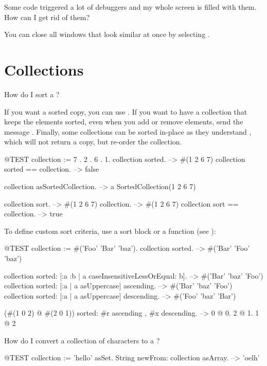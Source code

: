 \documentclass[a4paper,10pt,twoside]{book}
\begin{document}
\begin{faq}
Some code triggered a lot of debuggers and my whole screen is filled with them. 
How can I get rid of them?
\end{faq}
\answer
You can close all windows that look similar at once by selecting .

\section{Collections}

\begin{faq}
How do I sort a ?
\end{faq}
\answer
If you want a sorted copy, you can use . 
If you want to have a collection that keeps the elements sorted, even when you add or remove elements, send the message .
Finally, some collections can be sorted in-place as they understand , which will not return a copy, but re-order the collection.

\begin{code}{@TEST}
collection := {7 . 2 . 6 . 1}.
collection sorted. --> #(1 2 6 7)
collection sorted == collection. --> false

collection asSortedCollection. --> a SortedCollection(1 2 6 7)

collection sort. --> #(1 2 6 7)
collection. --> #(1 2 6 7)
collection sort == collection. --> true
\end{code}

To define custom sort criteria, use a sort block or a function (see ):

\begin{code}{@TEST}
collection := #('Foo' 'Bar' 'baz').
collection sorted. --> #('Bar' 'Foo' 'baz')

collection sorted: [:a :b | a caseInsensitiveLessOrEqual: b]. --> #('Bar' 'baz' 'Foo')
collection sorted: [:a | a asUppercase] ascending. --> #('Bar' 'baz' 'Foo')
collection sorted: [:a | a asUppercase] descending. --> #('Foo' 'baz' 'Bar')

(#(1 0 2) @ #(2 0 1)) sorted: #r ascending , #x descending. --> {0 @ 0. 2 @ 1. 1 @ 2}
\end{code}

\begin{faq}
How do I convert a collection of characters to a ?
\end{faq}
\answer
\begin{code}{@TEST}
collection := 'hello' asSet.
String newFrom: collection asArray. --> 'oelh'
\end{code}
\end{document}
